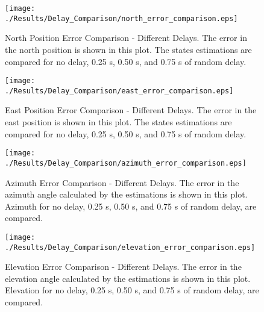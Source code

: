 \begin{figure}[H]
  \centering
  \texttt{[image: ./Results/Delay\_Comparison/north\_error\_comparison.eps]}
  \caption[North Position Error Comparison - Different Delays]{North Position Error Comparison - Different Delays. The error in the north position is shown in this plot. The states estimations are compared for no delay, 0.25 s, 0.50 s, and 0.75 s of random delay.}
\end{figure}
\begin{figure}[H]
  \centering
  \texttt{[image: ./Results/Delay\_Comparison/east\_error\_comparison.eps]}
  \caption[East Position Error Comparison - Different Delays]{East Position Error Comparison - Different Delays. The error in the east position is shown in this plot. The states estimations are compared for no delay, 0.25 s, 0.50 s, and 0.75 s of random delay.}
\end{figure}

\begin{figure}[H]
  \centering
  \texttt{[image: ./Results/Delay\_Comparison/azimuth\_error\_comparison.eps]}
  \caption[Azimuth Error Comparison - Different Delays]{Azimuth Error Comparison - Different Delays. The error in the azimuth angle calculated by the estimations is shown in this plot. Azimuth for no delay, 0.25 s, 0.50 s, and 0.75 s of random delay, are compared.}
\end{figure}

\begin{figure}[H]
  \centering
  \texttt{[image: ./Results/Delay\_Comparison/elevation\_error\_comparison.eps]}
  \caption[Elevation Error Comparison - Different Delays]{Elevation Error Comparison - Different Delays. The error in the elevation angle calculated by the estimations is shown in this plot. Elevation for no delay, 0.25 s, 0.50 s, and 0.75 s of random delay, are compared.}
\end{figure}

